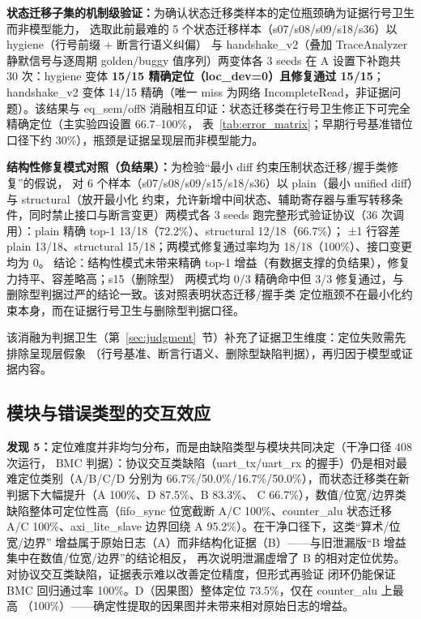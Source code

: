 \documentclass[twocolumn,10pt]{ctexart}
\begin{document}
\textbf{状态迁移子集的机制级验证：}为确认状态迁移类样本的定位瓶颈确为证据行号卫生而非模型能力，
选取此前最难的 5 个状态迁移样本（s07/s08/s09/s18/s36）以 hygiene（行号前缀 + 断言行语义纠偏）
与 handshake\_v2（叠加 TraceAnalyzer 静默信号与逐周期 golden/buggy 值序列）两变体各 3 seeds
在 A 设置下补跑共 30 次：hygiene 变体 \textbf{15/15 精确定位（loc\_dev=0）且修复通过 15/15}；
handshake\_v2 变体 14/15 精确（唯一 miss 为网络 IncompleteRead，非证据问题）。该结果与
eq\_sem/off8 消融相互印证：状态迁移类在行号卫生修正下可完全精确定位（主实验四设置 66.7--100\%，
表~\ref{tab:error_matrix}；早期行号基准错位口径下约 30\%），瓶颈是证据呈现层而非模型能力。

\textbf{结构性修复模式对照（负结果）：}为检验“最小 diff 约束压制状态迁移/握手类修复”的假说，
对 6 个样本（s07/s08/s09/s15/s18/s36）以 plain（最小 unified diff）与 structural（放开最小化
约束，允许新增中间状态、辅助寄存器与重写转移条件，同时禁止接口与断言变更）两模式各 3 seeds
跑完整形式验证协议（36 次调用）：plain 精确 top-1 13/18（72.2\%）、structural 12/18（66.7\%）；
±1 行容差 plain 13/18、structural 15/18；两模式修复通过率均为 18/18（100\%）、接口变更均为 0。
结论：结构性模式未带来精确 top-1 增益（有数据支撑的负结果），修复力持平、容差略高；s15（删除型）
两模式均 0/3 精确命中但 3/3 修复通过，与删除型判据过严的结论一致。该对照表明状态迁移/握手类
定位瓶颈不在最小化约束本身，而在证据行号卫生与删除型判据口径。

该消融为判据卫生（第~\ref{sec:judgment}~节）补充了证据卫生维度：定位失败需先排除呈现层假象
（行号基准、断言行语义、删除型缺陷判据），再归因于模型或证据内容。

\subsection{模块与错误类型的交互效应}

\textbf{发现 5：}定位难度并非均匀分布，而是由缺陷类型与模块共同决定（干净口径 408 次运行，
BMC 判据）：协议交互类缺陷（uart\_tx/uart\_rx 的握手）仍是相对最难定位类别（A/B/C/D 分别为
66.7\%/50.0\%/16.7\%/50.0\%），而状态迁移类在新判据下大幅提升（A 100\%、D 87.5\%、B 83.3\%、
C 66.7\%），数值/位宽/边界类缺陷整体可定位性高（fifo\_sync 位宽截断 A/C 100\%、counter\_alu
状态迁移 A/C 100\%、axi\_lite\_slave 边界回绕 A 95.2\%）。在干净口径下，这类“算术/位宽/边界”
增益属于原始日志（A）而非结构化证据（B）——与旧泄漏版“B 增益集中在数值/位宽/边界”的结论相反，
再次说明泄漏虚增了 B 的相对定位优势。对协议交互类缺陷，证据表示难以改善定位精度，但形式再验证
闭环仍能保证 BMC 回归通过率 100\%。D（因果图）整体定位 73.5\%，仅在 counter\_alu 上最高
（100\%）——确定性提取的因果图并未带来相对原始日志的增益。
\end{document}
